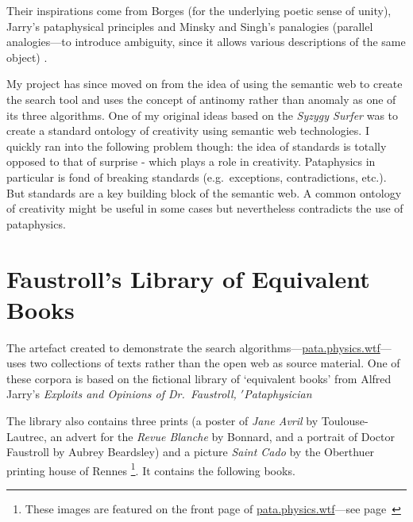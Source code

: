 Their inspirations come from Borges \autocite*{Borges2000} (for the underlying poetic sense of unity), Jarry's pataphysical principles \autocite*{Jarry1996} and Minsky and Singh's panalogies (parallel analogies---to introduce ambiguity, since it allows various descriptions of the same object) \autocite*{Singh2005}.

\spirals

My project has since moved on from the idea of using the semantic web to create the search tool and uses the concept of antinomy rather than anomaly as one of its three algorithms. One of my original ideas based on the \textit{Syzygy Surfer} was to create a standard ontology of creativity using semantic web technologies. I quickly ran into the following problem though: the idea of standards is totally opposed to that of surprise - which plays a role in creativity. Pataphysics in particular is fond of breaking standards (e.g.\ exceptions, contradictions, etc.). But standards are a key building block of the semantic web. A common ontology of creativity might be useful in some cases but nevertheless contradicts the use of pataphysics.


\section{Faustroll's Library of Equivalent Books}
\label{s:faustlib}

The artefact created to demonstrate the search algorithms---\url{pata.physics.wtf}---uses two collections of texts rather than the open web as source material. One of these corpora is based on the fictional library of `equivalent books' from Alfred Jarry's \textit{Exploits and Opinions of Dr.\ Faustroll, $'$Pataphysician} \citeyear{Jarry1996}

The library also contains three prints (a poster of \textit{Jane Avril} by Toulouse-Lautrec, an advert for the \textit{Revue Blanche} by Bonnard, and a portrait of Doctor Faustroll by Aubrey Beardsley) and a picture \textit{Saint Cado} by the Oberthuer printing house of Rennes \autocite{Jarry1996}\footnote{These images are featured on the front page of \url{pata.physics.wtf}---see page~\pageref{img:fullscreenshot1}}. It contains the following books.


